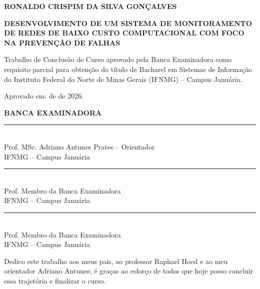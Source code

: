 \documentclass[12pt,a4paper]{article}
\begin{document}
\clearpage
\thispagestyle{empty}
\begin{center}
\textbf{RONALDO CRISPIM DA SILVA GONÇALVES}

\vspace{1.5em}
\textbf{DESENVOLVIMENTO DE UM SISTEMA DE MONITORAMENTO DE REDES DE BAIXO CUSTO COMPUTACIONAL COM FOCO NA PREVENÇÃO DE FALHAS}
\end{center}

\vspace{1.5em}
\begin{flushright}
\begin{minipage}{0.52\textwidth}
\singlespacing
Trabalho de Conclusão de Curso aprovado pela Banca Examinadora como requisito parcial para obtenção do título de Bacharel em Sistemas de Informação do Instituto Federal do Norte de Minas Gerais (IFNMG) -- Campus Januária.
\end{minipage}
\end{flushright}

\vspace{2em}
\noindent Aprovado em: \underline{\hspace{1.5cm}} de \underline{\hspace{3.5cm}} de 2026.

\vfill
\begin{center}
\textbf{BANCA EXAMINADORA}

\vspace{2.5em}
\rule{11cm}{0.4pt}\\
Prof. MSc. Adriano Antunes Prates -- Orientador\\
IFNMG -- Campus Januária

\vspace{2.5em}
\rule{11cm}{0.4pt}\\
Prof. Membro da Banca Examinadora\\
IFNMG -- Campus Januária

\vspace{2.5em}
\rule{11cm}{0.4pt}\\
Prof. Membro da Banca Examinadora\\
IFNMG -- Campus Januária
\end{center}
\vfill
\clearpage

\thispagestyle{empty}
\vspace*{0.60\textheight}
\begin{flushright}
\begin{minipage}{0.52\textwidth}
Dedico este trabalho aos meus pais, ao professor Raphael Hoed e ao meu orientador Adriano Antunes; é graças ao esforço de todos que hoje posso concluir essa trajetória e finalizar o curso.\end{minipage}
\end{flushright}
\clearpage
\end{document}

